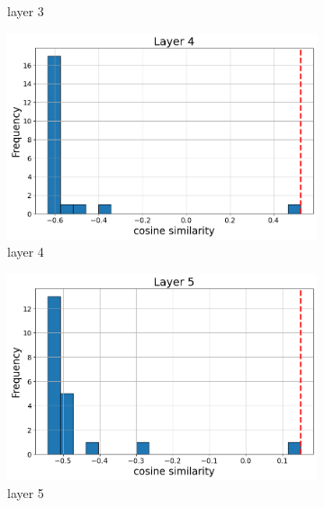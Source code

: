 \documentclass[11pt]{article}
\begin{document}
\begin{figure}[t]
\begin{subfigure}[t]{0.24\textwidth}
    \caption{layer 3}
  \end{subfigure}\hfill
    \vspace{2mm}

  \begin{subfigure}[t]{0.24\textwidth}
    \centering
    \includegraphics[width=1.4\columnwidth]{figures/obs2_appendix/obs2_layer4.png}
    \caption{layer 4}
  \end{subfigure}\hfill
  \begin{subfigure}[t]{0.24\textwidth}
    \centering
    \includegraphics[width=1.4\columnwidth]{figures/obs2_appendix/obs2_layer5.png}
    \caption{layer 5}
  \end{subfigure}\hfill
  \begin{subfigure}[t]{0.24\textwidth}
    \centering

\end{subfigure}
\end{figure}
\end{document}
